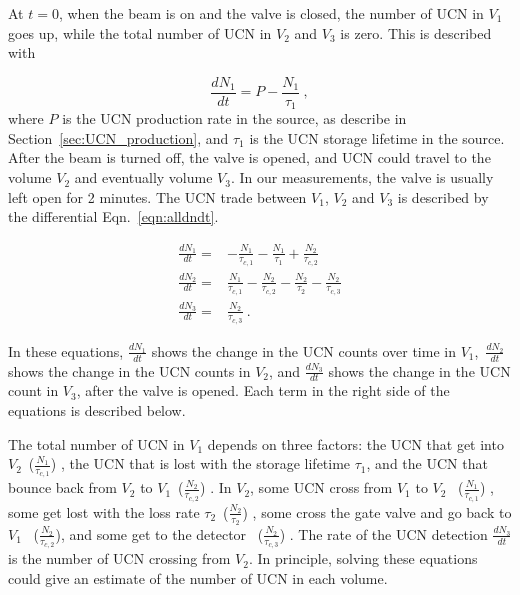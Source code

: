 At $t = 0$, when the beam is on and the valve is closed, the number of UCN in
$V_1$ goes up, while the total number of UCN in $V_2$ and $V_3$ is
zero. This is described with 

\begin{equation}
  \label{eqn:dndt}
\frac{dN_1}{dt} = P - \frac{N_1}{\tau_1}~,
\end{equation}
where $P$ is the UCN production rate in the source, as describe in
Section~\ref{sec:UCN_production}, and $\tau_1$ is the UCN storage
lifetime in the source. After the beam is turned off, the valve is
opened, and UCN could travel to the volume $V_2$ and eventually volume
$V_3$. In our measurements, the valve is usually left open for 2
minutes. The UCN trade between $V_1$, $V_2$ and $V_3$ is described by
the differential Eqn.~\ref{eqn:alldndt}.

\begin{equation}
  \label{eqn:alldndt}
  \begin{aligned}
    \frac{dN_1}{dt} =&- \frac{N_1}{\tau_{c,1}} - \frac{N_1}{\tau_1} + \frac{N_2}{\tau_{c,2}}  \\
    \frac{dN_2}{dt} =& \frac{N_1}{\tau_{c,1}} - \frac{N_2}{\tau_{c,2}} - \frac{N_2}{\tau_2} - \frac{N_2}{\tau_{c,3}} \\
    \frac{dN_3}{dt} =& \frac{N_2}{\tau_{c,3}}~.
  \end{aligned}
\end{equation}


In these equations, \large $\frac{dN_1}{dt}$ \normalsize shows the
change in the UCN counts over time in $V_1$,~\large $\frac{dN_2}{dt}$
\normalsize shows the change in the UCN counts in $V_2$, and \large
$\frac{dN_3}{dt}$ \normalsize shows the change in the UCN count in
$V_3$, after the valve is opened. Each term in the right side of the
equations is described below.

The total number of UCN in $V_1$ depends on three factors: the UCN
that get into $V_2$~\large($\frac{N_1}{\tau_{c,1}}$) \normalsize, the
UCN that is lost with the storage lifetime $\tau_1$, and the UCN that
bounce back from $V_2$ to $V_1$~\large ($\frac{N_2}{\tau_{c,2}}$)
\normalsize. In $V_2$, some UCN cross from $V_1$ to $V_2$~ \large
($\frac{N_1}{\tau_{c,1}}$) \normalsize, some get lost with the loss
rate $\tau_2$~\large ($\frac{N_2}{\tau_2}$) \normalsize, some cross
the gate valve and go back to $V_1$~ \large
($\frac{N_2}{\tau_{c,2}}$)\normalsize, and some get to the detector
~\large ($\frac{N_2}{\tau_{c,3}}$) \normalsize. The rate of the UCN
detection $\frac{dN_3}{dt}$ is the number of UCN crossing from $V_2$.
In principle, solving these equations could give an estimate of the
number of UCN in each volume.

